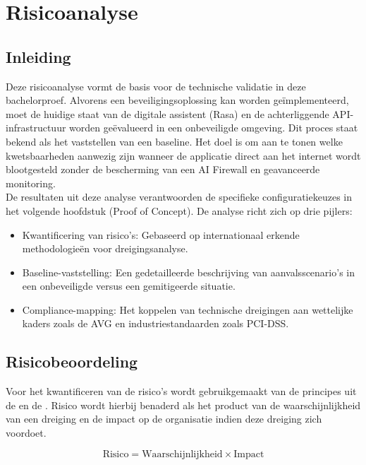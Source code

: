 \chapter{Risicoanalyse}
\label{ch:risicoanalyse}

\section{Inleiding}

Deze risicoanalyse vormt de basis voor de technische validatie in deze bachelorproef. Alvorens een beveiligingsoplossing kan worden geïmplementeerd, moet de huidige staat van de digitale assistent (Rasa) en de achterliggende API-infrastructuur worden geëvalueerd in een onbeveiligde omgeving. Dit proces staat bekend als het vaststellen van een baseline. Het doel is om aan te tonen welke kwetsbaarheden aanwezig zijn wanneer de applicatie direct aan het internet wordt blootgesteld zonder de bescherming van een AI Firewall en geavanceerde monitoring.\\

De resultaten uit deze analyse verantwoorden de specifieke configuratiekeuzes in het volgende hoofdstuk (Proof of Concept). De analyse richt zich op drie pijlers:

\begin{itemize}
    \item Kwantificering van risico's: Gebaseerd op internationaal erkende methodologieën voor dreigingsanalyse.
    \item Baseline-vaststelling: Een gedetailleerde beschrijving van aanvalsscenario's in een onbeveiligde versus een gemitigeerde situatie.
    \item Compliance-mapping: Het koppelen van technische dreigingen aan wettelijke kaders zoals de AVG en industriestandaarden zoals PCI-DSS.
\end{itemize}

\section{Risicobeoordeling}

Voor het kwantificeren van de risico's wordt gebruikgemaakt van de principes uit de \textcite{nist80030} en de \textcite{iso27005}. Risico wordt hierbij benaderd als het product van de waarschijnlijkheid van een dreiging en de impact op de organisatie indien deze dreiging zich voordoet.

\[
\text{Risico} = \text{Waarschijnlijkheid} \times \text{Impact}
\]

